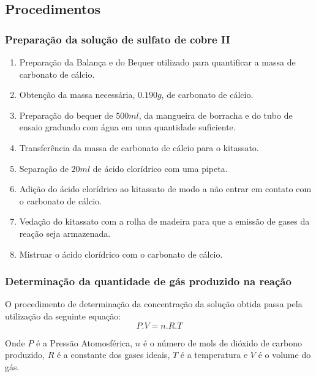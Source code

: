 \documentclass[a4paper, 11pt]{article}
\begin{document}
    \subsection{Procedimentos}\label{sec:procedimentos}
    \subsubsection{Preparação da solução de sulfato de cobre II}\label{sec:preparacao_solucao}
    \begin{enumerate}
        \item Preparação da Balança e do Bequer utilizado para quantificar a massa de carbonato de cálcio\@.
        \item Obtenção da massa necessária, $0.190g$, de carbonato de cálcio\@.
        \item Preparação do bequer de $500ml$, da mangueira de borracha e do tubo de ensaio graduado com água em uma quantidade suficiente\@.
        \item Transferência da massa de carbonato de cálcio para o kitassato\@.
        \item Separação de $20ml$ de ácido clorídrico com uma pipeta\@.
        \item Adição do ácido clorídrico ao kitassato de modo a não entrar em contato com o carbonato de cálcio\@.
        \item Vedação do kitassato com a rolha de madeira para que a emissão de gases da reação seja armazenada\@.
        \item Mistruar o ácido clorídrico com o carbonato de cálcio\@.
    \end{enumerate}
    \doublespacing

    \subsubsection{Determinação da quantidade de gás produzido na reação}\label{sec:determinacao_concentracao}
    \indent O procedimento de determinação da concentração da solução obtida passa pela utilização da seguinte equação:\\
    \begin{equation}
        \label{eq:equacao_concentracao}
        P.V = n.R.T
    \end{equation}

    \indent Onde $P$ é a Pressão Atomosférica, $n$ é o número de mols de dióxido de carbono produzido, $R$ é a constante dos gases ideais, $T$ é a temperatura e $V$ é o volume do gás\@.\\
\end{document}
